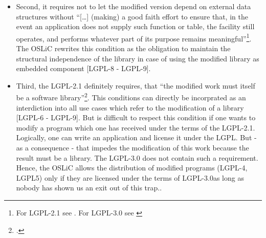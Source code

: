 \begin{itemize}
\begin{itemize}
    \item Second, it requires not to let the modified version depend on external
    data structures without \enquote{[\ldots] (making) a good faith effort to
    ensure that, in the event an application does not supply such function or
    table, the facility still operates, and performs whatever part of its
    purpose remains meaningful}\footnote{For LGPL-2.1 see \cite[cf.][\nopage
    wp.\ §2d]{Lgpl21OsiLicense1999a}. For LGPL-3.0 see \cite[cf.][\nopage wp.\
    §2a]{Lgpl30OsiLicense2007a}}. The OSLiC rewrites this condition as the
    obligation to maintain the structural independence of the library in case of
    using the modified library as embedded component [LGPL-8 - LGPL-9].
    
    \item \label{para:libislib}Third, the LGPL-2.1 definitely requires, that
    \enquote{the modified work must itself be a software
    library}\footcite[cf.][\nopage wp.\ §2]{Lgpl21OsiLicense1999a}. This
    conditions can directly be incorprated as an interdiction into all use cases
    which refer to the modification of a library [LGPL-6 - LGPL-9]. But is
    difficult to respect this condition if one wants to modify a program which
    one has received under the terms of the LGPL-2.1. Logically, one can write
    an application and license it under the LGPL. But - as a consequence - that
    impedes the modification of this work because the result must be a library.
    The LGPL-3.0 does not contain such a requirement. Hence, the OSLiC allows
    the distribution of modified programs (LGPL-4, LGPL5) only if they are
    licensed under the terms of LGPL-3.0{as long as nobody has shown us an exit
    out of this trap.}.
  \end{itemize}
  

\end{itemize}
